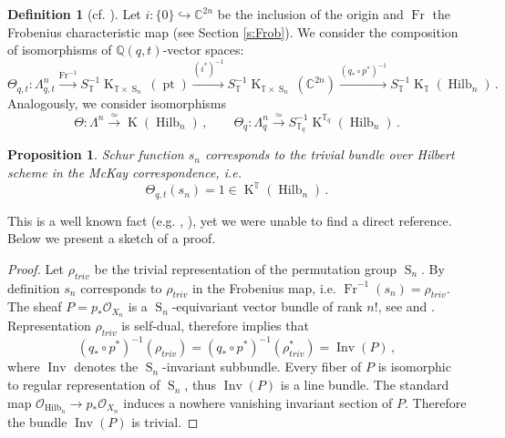 \documentclass[12pt,a4paper]{amsart}
\theoremstyle{plain}
\newtheorem{pro}[tw]{Proposition}
\theoremstyle{definition}
\newtheorem{df}[tw]{Definition}
\theoremstyle{remark}
\newcommand{\Hilb}[1]{\operatorname{Hilb}_{{#1}}}
\newcommand{\Perm}{\operatorname{S}}
\newcommand{\pt}{\operatorname{pt}}
\newcommand{\QQ}{\mathbb{Q}}
\newcommand{\CC}{\mathbb{C}}
\newcommand{\TT}{\mathbb{T}}
\newcommand{\Tq}{{\mathbb{T}_q}}
\def\O{\mathcal{O}}
\newcommand{\Fr}{\operatorname{Fr}}
\newcommand{\xtto}[1]{\stackrel{#1}{\longrightarrow}}
\newcommand{\xto}[1]{{\xrightarrow{#1}}}
\newcommand{\mono}{\hookrightarrow}
\DeclareMathOperator{\KTh}{K}
\begin{document}
\begin{df}[cf. {\cite[Section 3.2]{Boissiere}}] \label{df:McKay}
	Let $i\colon\{0\} \mono \CC^{2n}$ be the inclusion of the origin and $\Fr$ the Frobenius characteristic map (see Section \ref{s:Frob}).
	We consider the composition of isomorphisms of $\QQ(q,t)$-vector spaces:
	$$
	\Theta_{q,t}\colon \Lambda_{q,t}^n\xto{\Fr^{-1}}
	 S^{-1}_{\TT}\KTh_{\TT\times\Perm_n}(\pt) \xto{(i^*)^{-1}}
	 S^{-1}_{\TT}\KTh_{\TT\times\Perm_n}(\CC^{2n}) \xto{(q_*\circ p^*)^{-1}}
	 S^{-1}_{\TT}\KTh_{\TT}(\Hilb{n})\,.
	$$
	Analogously, we consider isomorphisms
	$$\Theta: \Lambda^n \xtto{\simeq} \KTh (\Hilb{n}) \,, \qquad \Theta_q: \Lambda_q^n  \xtto{\simeq} S^{-1}_\Tq \KTh^\Tq(\Hilb{n})  \,.$$ 
\end{df}
\begin{pro} \label{pro:sn}
	Schur function $s_n$ corresponds to the trivial bundle over Hilbert scheme in the McKay correspondence, i.e.
	$$\Theta_{q,t}(s_n)=1 \in \KTh^\TT(\Hilb{n})\,.$$
\end{pro}
This is a well known fact (e.g. \cite[First dot in Section 8.1]{Boissiere}, \cite[Discussion after Proposition 5.4.6]{Haiman_surv}), yet we were unable to find a direct reference. Below we present a sketch of a proof.
\begin{proof}[Proof]
	Let $\rho_{triv}$ be the trivial representation of the permutation group $\Perm_n$. By definition $s_n$ corresponds to $\rho_{triv}$ in the Frobenius map, i.e. $\Fr^{-1}(s_n)=\rho_{triv}$. \\
	The sheaf $P=p_*\O_{X_n}$ is a  $\Perm_n$-equivariant vector bundle of rank $n!$, see \cite[Theorem 1]{Haiman} and \cite[Theorem 5.2.1]{Haiman2}.
	Representation $\rho_{triv}$ is self-dual, therefore \cite[discussion after Formula 5.3]{ItoNakajima} implies that
	$$
	(q_*\circ p^*)^{-1}(\rho_{triv})=(q_*\circ p^*)^{-1}(\rho^*_{triv})=
	\operatorname{Inv}(P)\,,
	$$
	where $\operatorname{Inv}$ denotes the $\Perm_n$-invariant subbundle. Every fiber of $P$ is isomorphic to regular representation of $\Perm_n$, thus $\operatorname{Inv}(P)$ is a line bundle. The standard map
	$\O_{\Hilb{n}}\to p_*\O_{X_n}$ induces a nowhere vanishing invariant section of $P$. Therefore the bundle $\operatorname{Inv}(P)$ is trivial.
\end{proof}
\end{document}
